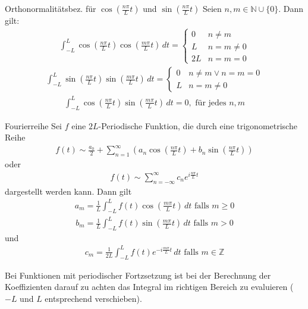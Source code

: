 \documentclass[a4paper,10pt]{article}
\begin{document}
\begin{subbox}{Orthonormalitätsbez. für $\cos(\frac{n\pi}{L}t)$ und $\sin(\frac{n\pi}{L}t)$}
  Seien \(n,m\in\mathbb{N}\cup\{0\}\). Dann gilt:
\begin{align*}\int_{-L}^L\cos\left(\frac{n\pi}{L}t\right)\cos\left(\frac{m\pi}{L}t\right)\,dt=\begin{cases}0&n\neq m\\L&n=m\neq0\\2L&n=m=0 \end{cases} \end{align*}
\begin{align*} \int_{-L}^L\sin\left(\frac{n\pi}{L}t\right)\sin\left(\frac{m\pi}{L}t\right)\,dt=\begin{cases}0&n\neq m \lor n = m = 0\\L&n=m\neq0 \end{cases} \end{align*}
\begin{align*} \int_{-L}^L\cos\left(\frac{n\pi}{L}t\right)\sin\left(\frac{m\pi}{L}t\right)\,dt=0, \text{ für jedes }n,m  \end{align*}

\end{subbox}

\begin{mainbox}{Fourierreihe}
  Sei \(f\) eine \(2L\)-Periodische Funktion, die durch eine trigonometrische Reihe \begin{align*} f(t)\sim \frac{a_0}{2}+\sum_{n=1}^\infty\left(a_n\cos\left(\frac{n\pi}{L}t\right)+b_n\sin\left(\frac{n\pi}{L}t\right)\right)  \end{align*} 
  oder 
  \begin{align*} f(t)\sim \sum_{n=-\infty}^\infty c_ne^{ i\frac{n\pi}{L}t} \end{align*} dargestellt werden kann. Dann gilt 
  \begin{align*} a_m=\frac{1}{L}\int_{-L}^Lf(t)\cos\left(\frac{m\pi}{L}t\right)\,dt \text{ falls } m\geq 0  \end{align*} \begin{align*} b_m=\frac{1}{L}\int_{-L}^Lf(t)\sin\left(\frac{m\pi}{L}t\right)\,dt \text{ falls } m>0  \end{align*} und \begin{align*} c_m=\frac{1}{2L}\int_{-L}^Lf(t)e^{- i \frac{m\pi}{L} t}\,dt \text{ falls } m\in\mathbb{Z}  \end{align*}

  Bei Funktionen mit periodischer Fortzsetzung ist bei der Berechnung der Koeffizienten darauf zu achten das Integral im richtigen Bereich zu evaluieren ($-L$ und $L$ entsprechend verschieben).

\end{mainbox}
\end{document}
